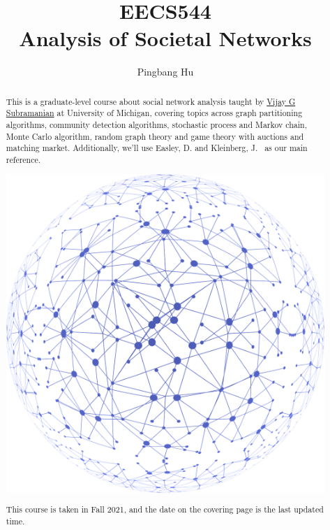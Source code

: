 \documentclass[a4paper]{report}
\author{Pingbang Hu}
\title{EECS544\\Analysis of Societal Networks}
\begin{document}
\maketitle

\begin{abstract}
	This is a graduate-level course about social network analysis taught by \href{https://subramanian.engin.umich.edu/}{Vijay G Subramanian} at University of Michigan, covering topics across graph partitioning algorithms, community detection algorithms, stochastic process and Markov chain, Monte Carlo algorithm, random graph theory and game theory with auctions and matching market. Additionally, we'll use Easley, D. and Kleinberg, J.~\cite{easley2010networks} as our main reference.

	\vfill
	\begin{center}
		\includegraphics[width=.8\linewidth]{Figures/cover.png}
	\end{center}
	\vfill
	This course is taken in Fall 2021, and the date on the covering page is the last updated time.
\end{abstract}

\tableofcontents

\newpage


\newpage
\appendix
\appendixpage{}



\newpage
\printbibliography{}
\end{document}
